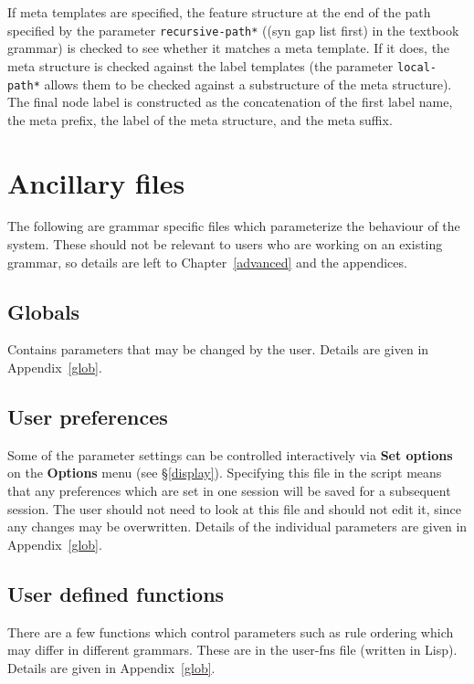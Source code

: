 \documentclass[12pt]{report}
\begin{document}
If meta templates are specified, the feature structure at the
end of the path specified by the parameter {\tt *recursive-path*}
(({\sc syn gap list first}) in the textbook grammar)
is checked to see whether it matches a meta template.
If it does, the meta structure is checked against the label templates 
(the parameter {\tt *local-path*}
allows them to be checked against a substructure of the meta structure).
The final node label is constructed as the concatenation
of the first label name, the meta prefix, the label of
the meta structure, and the meta suffix.  


\section{Ancillary files}
\label{ancil}

The following are grammar specific files which parameterize the behaviour of
the system.  These should not be relevant to users who are working on an
existing grammar, so details are left to Chapter~\ref{advanced} and the
appendices.

\subsection{Globals}

Contains parameters that may be changed by the user.  
Details are given in Appendix~\ref{glob}.

\subsection{User preferences}

Some of the parameter settings can be controlled interactively
via {\bf Set options} on the {\bf Options} menu 
(see \S\ref{display}).
Specifying this file in the script means that any preferences 
which are set in one session will be saved for a subsequent session.
The user should not need to look at this file and 
should not edit it, since any changes may be overwritten.
Details of the individual
parameters are given in Appendix~\ref{glob}.

\subsection{User defined functions}

There are a few functions which control parameters such as rule
ordering which may differ in different grammars.  These are
in the user-fns file (written in Lisp).
Details are given in Appendix~\ref{glob}.
\end{document}
